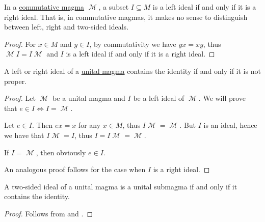 \begin{proposition}\label{thm:commutative_magma_ideals}
  In a \hyperref[def:magma/commutative]{commutative magma} \( \mscrM \), a subset \( I \subseteq M \) is a left ideal if and only if it is a right ideal. That is, in commutative magmas, it makes no sense to distinguish between left, right and two-sided ideals.
\end{proposition}
\begin{proof}
  For \( x \in M \) and \( y \in I \), by commutativity we have \( yx = xy \), thus \( \mscrM I = I \mscrM \) and \( I \) is a left ideal if and only if it is a right ideal.
\end{proof}

\begin{proposition}\label{thm:proper_ideals_containing_identity}
  A left or right ideal of a \hyperref[def:unital_magma]{unital magma} contains the identity if and only if it is not proper.
\end{proposition}
\begin{proof}
  Let \( \mscrM \) be a unital magma and \( I \) be a left ideal of \( \mscrM \). We will prove that \( e \in I \iff I = \mscrM \).

  \SufficiencySubProof Let \( e \in I \). Then \( ex = x \) for any \( x \in M \), thus \( I\mscrM = \mscrM \). But \( I \) is an ideal, hence we have that \( I\mscrM = I \), thus \( I = I\mscrM = \mscrM \).

  \NecessitySubProof If \( I = \mscrM \), then obviously \( e \in I \).

  An analogous proof follows for the case when \( I \) is a right ideal.
\end{proof}

\begin{corollary}\label{thm:unital_magma_ideal_is_submagma_iff_contains_identity}
  A two-sided ideal of a unital magma is a unital submagma if and only if it contains the identity.
\end{corollary}
\begin{proof}
  Follows from  and .
\end{proof}

